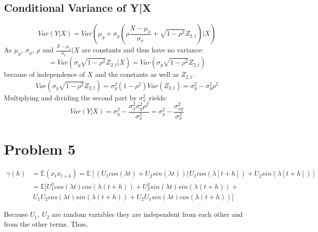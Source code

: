 \documentclass[11pt]{article}
\begin{document}
\subsection{Conditional Variance of Y|X}
\label{sec:cond-vari-yx}
\begin{equation}
  \label{eq:16}
    Var(Y|X) = Var(\mu_y + \sigma_y (\rho \frac{X-\mu_x}{\sigma_x} + \sqrt{1-\rho^2} Z_{2,t})|X)
\end{equation}
As $\mu_y,\ \sigma_y,\ \rho$ and $\frac{X-\mu_x}{\sigma_x}|X$ are constants and thus have no variance:
\begin{equation}
  \label{eq:17}
  = Var(\sigma_y \sqrt{1-\rho^2} Z_{2,t}|X) = Var(\sigma_y \sqrt{1-\rho^2} Z_{2,t})
\end{equation}
because of independence of $X$ and the constants as well as $Z_{2,t}$.
\begin{equation}
  \label{eq:18}
  Var(\sigma_y \sqrt{1-\rho^2} Z_{2,t}) = \sigma_y^2 (1-\rho^2) Var(Z_{2,t}) = \sigma_y^2 - \sigma_y^2 \rho^2
\end{equation}
Multiplying and dividing the second part by $\sigma_x^2$ yields:
\begin{equation}
  \label{eq:19}
  Var(Y|X) = \sigma_y^2 - \frac{\sigma_x^2 \sigma_y^2 \rho^2}{\sigma_x^2} = \sigma_y^2 - \frac{\sigma_{xy}^2}{\sigma_x^2}
\end{equation}


\section{Problem 5}
\label{sec:problem-5}

\begin{equation}
  \label{eq:14}
  \begin{split}
    \gamma(h)&=\mathbb{E} (x_tx_{t+h})=\mathbb{E} [(U_1cos(\lambda t)+U_2sin(\lambda t))(U_1cos(\lambda [t+h])+U_2sin(\lambda [t+h])]\\
    &= \mathbb{E} [U_1^2 cos(\lambda t)cos(\lambda(t+h)) + U_2^2 sin(\lambda t)sin(\lambda (t+h)) + \\
    &\  U_1U_2 cos(\lambda t) sin(\lambda (t+h)) + U_2 U_1 sin(\lambda t) cos(\lambda (t+h))]
  \end{split}
\end{equation}

Because $U_1,\ U_2$ are random variables they are independent from each other and from the other terms. Thus,
\end{document}
